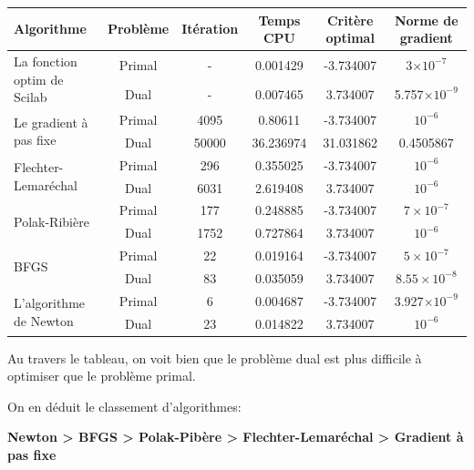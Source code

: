 \begin{center}
    \begin{tabular}{| l | c | c | c | c | c |}
    \hline
    Algorithme & Problème & Itération & Temps CPU & Critère optimal & Norme de gradient \\ \hline
      \multirow{2}{*}{La fonction optim de Scilab} & Primal & - & 0.001429 & -3.734007 & 3$\times 10^{-7}$\\ \cline{2-6}
      & Dual & - & 0.007465 & 3.734007 & 5.757$\times 10^{-9}$ \\ \hline
      \multirow{2}{*}{Le gradient à pas fixe} & Primal & 4095 & 0.80611 & -3.734007 & $10^{-6}$ \\ \cline{2-6}
      & Dual & 50000 & 36.236974 & 31.031862 & 0.4505867 \\ \hline
      \multirow{2}{*}{Flechter-Lemaréchal} & Primal & 296 & 0.355025 & -3.734007 & $10^{-6}$\\  \cline{2-6}
      & Dual & 6031 & 2.619408 & 3.734007 & $10^{-6}$ \\ \hline
      \multirow{2}{*}{Polak-Ribière}  & Primal & 177 & 0.248885 & -3.734007 & $7\times 10^{-7}$\\  \cline{2-6}
      & Dual & 1752 & 0.727864 & 3.734007 & $10^{-6}$ \\ \hline
      \multirow{2}{*}{BFGS} & Primal & 22 & 0.019164& -3.734007 & $5\times 10^{-7}$\\ \cline{2-6}
      & Dual & 83 & 0.035059 & 3.734007 & $8.55 \times 10^{-8}$ \\ \hline
      \multirow{2}{*}{L'algorithme de Newton} & Primal & 6 & 0.004687 & -3.734007 & 3.927$\times 10^{-9}$\\ \cline{2-6}
      & Dual & 23 & 0.014822 & 3.734007 & $10^{-6}$ \\ \hline
    \end{tabular}
  \end{center}

  Au travers le tableau, on voit bien que le problème dual est plus difficile à optimiser que le problème primal.

  On en déduit le classement d'algorithmes:

  \begin{center}
    \textbf{Newton > BFGS > Polak-Pibère > Flechter-Lemaréchal > Gradient à pas fixe}
  \end{center}



              